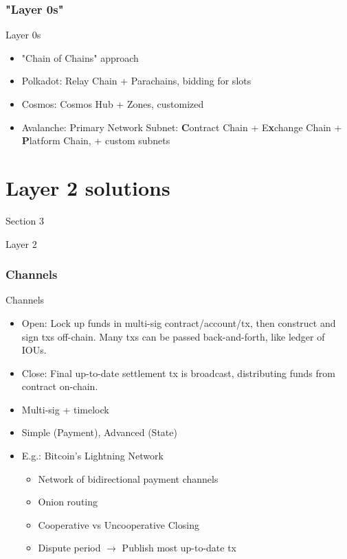 \documentclass[aspectratio=169,xcolor=dvipsnames]{beamer}
\begin{document}
\subsubsection{"Layer 0s"}
\begin{frame}{Layer 0s}
\begin{itemize}
    \item "Chain of Chains" approach
    \item Polkadot: Relay Chain + Parachains, bidding for slots
    \item Cosmos: Cosmos Hub + Zones, customized
    \item Avalanche: Primary Network Subnet: \textbf{C}ontract Chain + E\textbf{x}change Chain + \textbf{P}latform Chain, + custom subnets
\end{itemize}
\end{frame}

\section{Layer 2 solutions}
\begin{frame}{Section 3}
    \Huge{\centerline{Layer 2}}
\end{frame}
\subsubsection{Channels}
\begin{frame}{Channels}
\begin{itemize}
    \item Open: Lock up funds in multi-sig contract/account/tx, then construct and sign txs off-chain. Many txs can be passed back-and-forth, like ledger of IOUs.
    \item Close: Final up-to-date settlement tx is broadcast, distributing funds from contract on-chain.
    \item Multi-sig + timelock
    \item Simple (Payment), Advanced (State)
    \item E.g.: Bitcoin's Lightning Network
    \begin{itemize}
        \item Network of bidirectional payment channels
        \item Onion routing
        \item Cooperative vs Uncooperative Closing
        \item Dispute period $\rightarrow$ Publish most up-to-date tx
    \end{itemize}
\end{itemize}
\end{frame}
\end{document}

